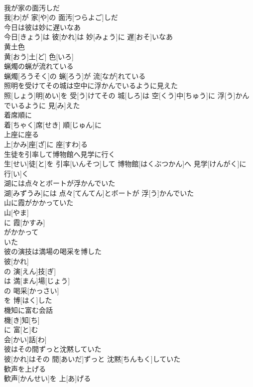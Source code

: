 \documentclass[8pt]{extreport}
\begin{document}
\begin{CJK}{UTF8}{min}
\\	我が家の面汚しだ	
\\	我[わ]が 家[や]の 面汚[つらよご]しだ
\\	今日は彼は妙に遅いなあ	
\\	今日[きょう]は 彼[かれ]は 妙[みょう]に 遅[おそ]いなあ
\\	黄土色	
\\	黄[おう]土[ど] 色[いろ]
\\	蝋燭の蝋が流れている	
\\	蝋燭[ろうそく]の 蝋[ろう]が 流[なが]れている
\\	照明を受けてその城は空中に浮かんでいるように見えた	
\\	照[しょう]明[めい]を 受[う]けてその 城[しろ]は 空[くう]中[ちゅう]に 浮[う]かんでいるように 見[み]えた
\\	着席順に	
\\	着[ちゃく]席[せき] 順[じゅん]に
\\	上座に座る	
\\	上[かみ]座[ざ]に 座[すわ]る
\\	生徒を引率して博物館へ見学に行く	
\\	生[せい]徒[と]を 引率[いんそつ]して 博物館[はくぶつかん]へ 見学[けんがく]に 行[い]く
\\	湖には点々とボートが浮かんでいた	
\\	湖[みずうみ]には 点々[てんてん]とボートが 浮[う]かんでいた
\\	山に霞がかかっていた	
\\	山[やま]
\\	に 霞[かすみ]
\\	がかかって 
\\	いた 
\\	彼の演技は満場の喝采を博した	
\\	彼[かれ]
\\	の 演[えん]技[ぎ]
\\	は 満[まん]場[じょう]
\\	の 喝采[かっさい]
\\	を 博[はく]した 
\\	機知に富む会話	
\\	機[き]知[ち]
\\	に 富[と]む 
\\	会[かい]話[わ]
\\	彼はその間ずっと沈黙していた	
\\	彼[かれ]はその 間[あいだ]ずっと 沈黙[ちんもく]していた
\\	歓声を上げる	
\\	歓声[かんせい]を 上[あ]げる

\end{CJK}
\end{document}
